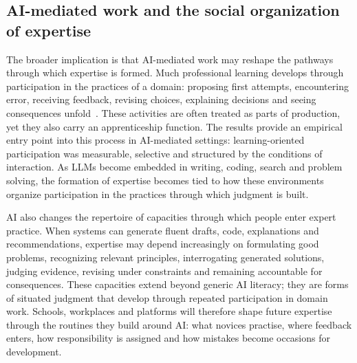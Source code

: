 
\subsection*{AI-mediated work and the social organization of expertise}

The broader implication is that AI-mediated work may reshape the pathways through which expertise is formed. Much professional learning develops through participation in the practices of a domain: proposing first attempts, encountering error, receiving feedback, revising choices, explaining decisions and seeing consequences unfold~\cite{brown1989situated,collins2018cognitive}. These activities are often treated as parts of production, yet they also carry an apprenticeship function. The results provide an empirical entry point into this process in AI-mediated settings: learning-oriented participation was measurable, selective and structured by the conditions of interaction. As LLMs become embedded in writing, coding, search and problem solving, the formation of expertise becomes tied to how these environments organize participation in the practices through which judgment is built.

AI also changes the repertoire of capacities through which people enter expert practice. When systems can generate fluent drafts, code, explanations and recommendations, expertise may depend increasingly on formulating good problems, recognizing relevant principles, interrogating generated solutions, judging evidence, revising under constraints and remaining accountable for consequences. These capacities extend beyond generic AI literacy; they are forms of situated judgment that develop through repeated participation in domain work. Schools, workplaces and platforms will therefore shape future expertise through the routines they build around AI: what novices practise, where feedback enters, how responsibility is assigned and how mistakes become occasions for development.

